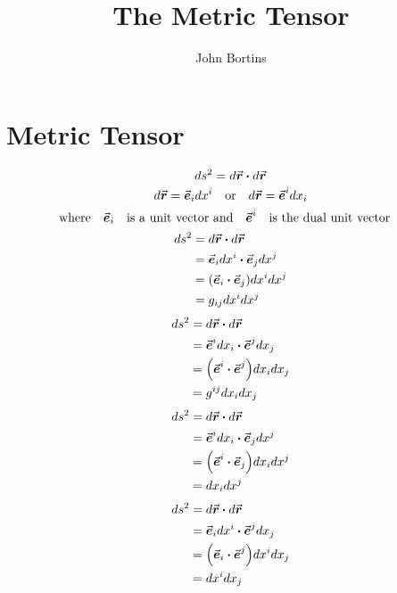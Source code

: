 \documentclass{article}
\title{The Metric Tensor}
\author{John Bortins}
\begin{document}
\maketitle{}
\section*{Metric Tensor}
\[ds^2=d\va*{r}\vdot d\va*{r} \]
\[d\va*{r}=\va*{e}_i dx^i\qor d\va*{r}=\va*{e}^i dx_i \]
\[\qq*{where}\va*{e}_i\qq{is a unit vector and}\va*{e}^i\qq{is the dual unit vector} \]
\begin{align*}
    ds^2 & =d\va*{r}\vdot d\va*{r}                    \\
         & =\va*{e}_i dx^i\vdot \va*{e}_j dx^j        \\
         & =\pqty{\va*{e}_i\vdot \va*{e}_j} dx^i dx^j \\
         & =g_{ij} dx^i dx^j                          \\
\end{align*}
\begin{align*}
    ds^2 & =d\va*{r}\vdot d\va*{r}                    \\
         & =\va*{e}^i dx_i\vdot \va*{e}^j dx_j        \\
         & =\pqty{\va*{e}^i\vdot \va*{e}^j} dx_i dx_j \\
         & =g^{ij} dx_i dx_j                          \\
\end{align*}
\begin{align*}
    ds^2 & =d\va*{r}\vdot d\va*{r}                    \\
         & =\va*{e}^i dx_i\vdot \va*{e}_j dx^j        \\
         & =\pqty{\va*{e}^i\vdot \va*{e}_j} dx_i dx^j \\
         & =dx_i dx^j                                 \\
\end{align*}
\begin{align*}
    ds^2 & =d\va*{r}\vdot d\va*{r}                    \\
         & =\va*{e}_i dx^i\vdot \va*{e}^j dx_j        \\
         & =\pqty{\va*{e}_i\vdot \va*{e}^j} dx^i dx_j \\
         & =dx^i dx_j                                 \\
\end{align*}
\end{document}

